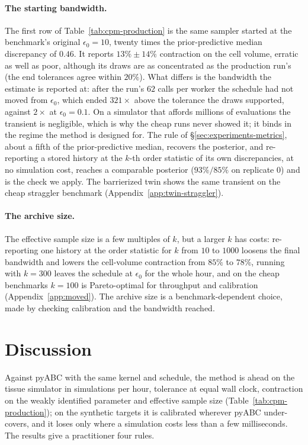\documentclass[10pt]{article}
\theoremstyle{plain}
\theoremstyle{definition}
\begin{document}
\paragraph{The starting bandwidth.} The first row of Table~\ref{tab:cpm-production} is the same sampler started at the benchmark's original $\epsilon_0=10$, twenty times the prior-predictive median discrepancy of $0.46$. It reports $13\%\pm14\%$ contraction on the cell volume, erratic as well as poor, although its draws are as concentrated as the production run's (the end tolerances agree within $20\%$). What differs is the bandwidth the estimate is reported at: after the run's $62$ calls per worker the schedule had not moved from $\epsilon_0$, which ended $321\times$ above the tolerance the draws supported, against $2\times$ at $\epsilon_0=0.1$. On a simulator that affords millions of evaluations the transient is negligible, which is why the cheap runs never showed it; it binds in the regime the method is designed for. The rule of \S\ref{sec:experiments-metrics}, about a fifth of the prior-predictive median, recovers the posterior, and re-reporting a stored history at the $k$-th order statistic of its own discrepancies, at no simulation cost, reaches a comparable posterior ($93\%/85\%$ on replicate $0$) and is the check we apply. The barrierized twin shows the same transient on the cheap straggler benchmark (Appendix~\ref{app:twin-straggler}).

\paragraph{The archive size.} The effective sample size is a few multiples of $k$, but a larger $k$ has costs: re-reporting one history at the order statistic for $k$ from $10$ to $1000$ loosens the final bandwidth and lowers the cell-volume contraction from $85\%$ to $78\%$, running with $k=300$ leaves the schedule at $\epsilon_0$ for the whole hour, and on the cheap benchmarks $k=100$ is Pareto-optimal for throughput and calibration (Appendix~\ref{app:moved}). The archive size is a benchmark-dependent choice, made by checking calibration and the bandwidth reached.

\section{Discussion}\label{sec:discussion}
Against pyABC with the same kernel and schedule, the method is ahead on the tissue simulator in simulations per hour, tolerance at equal wall clock, contraction on the weakly identified parameter and effective sample size (Table~\ref{tab:cpm-production}); on the synthetic targets it is calibrated wherever pyABC under-covers, and it loses only where a simulation costs less than a few milliseconds. The results give a practitioner four rules.
\end{document}
